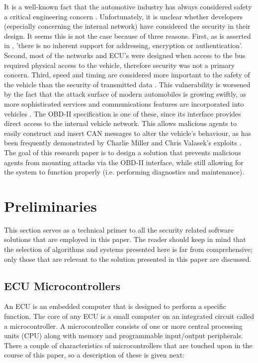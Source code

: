 It is a well-known fact that the automotive industry has always considered safety a critical engineering concern \cite{Dyer}. Unfortunately, it is unclear whether developers (especially concerning the internal network) have considered the security in their design. It seems this is not the case because of three reasons. First, as is asserted in \cite{MillerB}, 'there is no inherent support for addressing, encryption or authentication'. Second, most of the networks and ECU's were designed when access to the bus required physical access to the vehicle, therefore security was not a primary concern. Third, speed and timing are considered more important to the safety of the vehicle than the security of transmitted data \cite{Klinedinst05}. This vulnerability is worsened by the fact that the attack surface of modern automobiles is growing swiftly, as more sophisticated services and communications features are incorporated into vehicles \cite{Kosher}. The OBD-II specification is one of these, since its interface provides direct access to the internal vehicle network. This allows malicious agents to easily construct and insert CAN messages to alter the vehicle's behaviour, as has been frequently demonstrated by Charlie Miller and Chris Valasek's exploits \cite{MillerA, MillerB, MillerC}. The goal of this research paper is to design a solution that prevents malicious agents from mounting attacks via the OBD-II interface, while still allowing for the system to function properly (i.e. performing diagnostics and maintenance). 

\section{Preliminaries}
\label{chap:preliminaries}

This section serves as a technical primer to all the security related software solutions that are employed in this paper. The reader should keep in mind that the selection of algorithms and systems presented here is far from comprehensive; only those that are relevant to the solution presented in this paper are discussed.

\subsection{ECU Microcontrollers}
\label{sec:microcontrollers}

An ECU is an embedded computer that is designed to perform a specific function. The core of any ECU is a small computer on an integrated circuit called a microcontroller. A microcontroller consists of one or more central processing units (CPU) along with memory and programmable input/output peripherals. There a couple of characteristics of microcontrollers that are touched upon in the course of this paper, so a description of these is given next:

